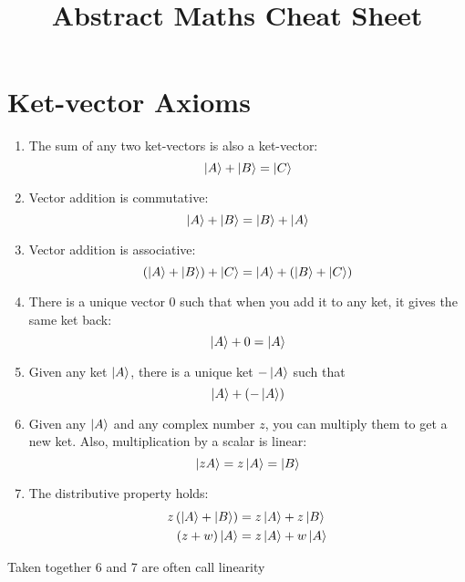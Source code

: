 \documentclass[12pt,a5paper]{article}
\title{Abstract Maths Cheat Sheet}
\date{}
\author{}
\begin{document}
\maketitle

\section{Ket-vector Axioms}
\begin{enumerate}
    \item The sum of any two ket-vectors is also a ket-vector:
    \begin{equation}
        \ket{A}  + \ket{B} = \ket{C}
    \end{equation}
    \item Vector addition is commutative:
    \begin{equation}
        \ket{ A } +\ket{ B } =\ket{B} +\ket{A}
    \end{equation}
    \item Vector addition is associative:
    \begin{equation}
        \left(\ket{ A } +\ket{ B }\right)+\ket{ C } =\ket{ A } +  \left(\ket{B }+\ket{ C }\right)
    \end{equation}
    \item There is a unique vector $0$ such that when you add it to any ket, it gives the same ket back:
    \begin{equation}
       \ket{ A } + 0 =\ket{ A }
    \end{equation}
    \item Given any ket $\ket{A}$, there is a unique ket $-\ket{A}$ such that
    \begin{equation}
       \ket{A} + \left( -\ket{A} \right)
    \end{equation}
    \item Given any $\ket{A}$ and any complex number $z$, you can multiply them to get a new ket. Also, multiplication by a scalar is linear:
    \begin{equation}
       \ket{zA} = z\ket{ A } =\ket{B}
    \end{equation}
    \item The distributive property holds:
    \begin{align}
        z\left(\ket{A} +\ket{B}\right) &=  z\ket{A} + z\ket{B}\\
        \left( z+w\right)\ket{A} &= z\ket{A} + w\ket{A}
    \end{align}
\end{enumerate}
Taken together 6 and 7 are often call linearity
\end{document}
